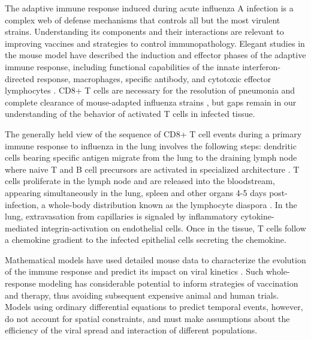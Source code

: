 \documentclass[10pt]{article}
\begin{document}
The adaptive immune response induced during acute influenza A infection is a complex web of defense mechanisms that controls all but the most virulent strains.  Understanding its components and their interactions are relevant to improving vaccines and strategies to control immunopathology. Elegant studies in the mouse model have described the induction and effector phases of the adaptive immune response, including functional capabilities of the innate interferon-directed response, macrophages, specific antibody, and cytotoxic effector lymphocytes \cite{Sallusto2000, Joo2008, Mackay2008}.   CD8+ T cells are necessary for the resolution of pneumonia and complete clearance of mouse-adapted influenza strains \cite{Sallusto2000, Joo2008, Mackay2008, Miao2010}, but gaps remain in our understanding of the behavior of activated T cells in infected tissue.

The generally held view of the sequence of CD8+ T cell events during a primary immune response to influenza in the lung involves the following steps: dendritic cells bearing specific antigen migrate from the lung to the draining lymph node where naive T and B cell precursors are activated in specialized architecture \cite{Saenz2010, Beltman2007, Handel2008, Zheng2008, Ingulli2009, Allan1990}.  T cells proliferate in the lymph node and are released into the bloodstream, appearing simultaneously in the lung, spleen and other organs 4-5 days post-infection, a whole-body distribution known as the lymphocyte diaspora \cite{Thelen2008}.  In the lung, extravasation from capillaries is signaled by inflammatory cytokine-mediated integrin-activation on endothelial cells.  Once in the tissue, T cells follow a chemokine gradient to the infected epithelial cells secreting the chemokine.

Mathematical models have used detailed mouse data to characterize the evolution of the immune response and predict its impact on viral kinetics \cite{Thomas-Vaslin2008, Beauchemin2008, Smith2010, Thakar2010, Burrowes2004}.  Such whole-response modeling has considerable potential to inform strategies of vaccination and therapy, thus avoiding subsequent expensive animal and human trials.  Models using ordinary differential equations to predict temporal events, however, do not account for spatial constraints, and must make assumptions about the efficiency of the viral spread and interaction of different populations. 
\end{document}
